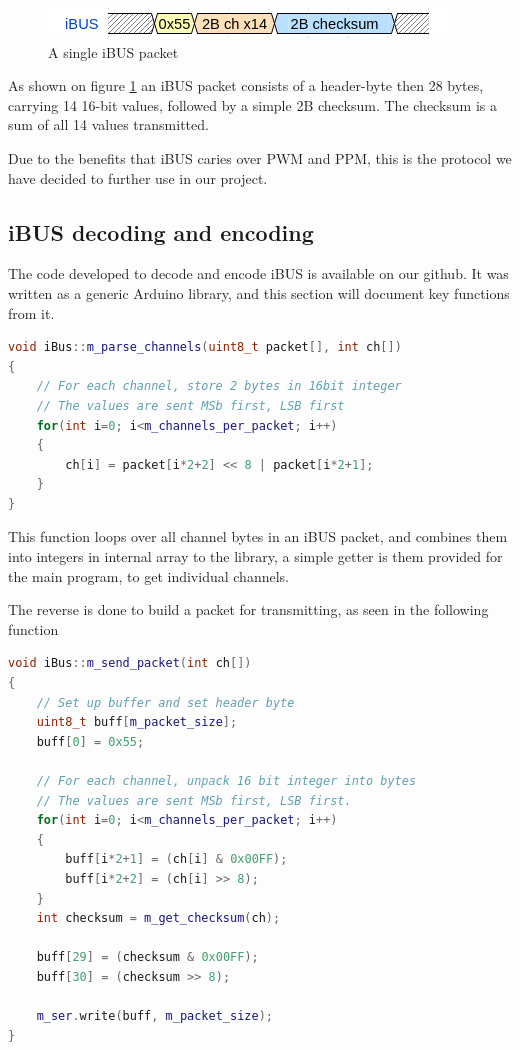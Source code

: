 \begin{figure}[h]
    \centering
    \includegraphics[width=0.8\columnwidth]{figures/ch_design/iBUS.png}
    \caption{A single iBUS packet}
    \label{fig:iBUS}
\end{figure}

As shown on figure \ref{fig:iBUS} an iBUS packet consists of a header-byte then 28 bytes, carrying 14 16-bit values, followed by a simple 2B checksum. The checksum is a sum of all 14 values transmitted.

Due to the benefits that iBUS caries over PWM and PPM, this is the protocol we have decided to further use in our project.

\subsection{iBUS decoding and encoding}

The code developed to decode and encode iBUS is available on our github\cite{ibus-lib}.
It was written as a generic Arduino library, and this section will document key functions from it.

\begin{lstlisting}[language=C++, caption={Parser for iBUS packets}]
void iBus::m_parse_channels(uint8_t packet[], int ch[])
{
	// For each channel, store 2 bytes in 16bit integer
	// The values are sent MSb first, LSB first
	for(int i=0; i<m_channels_per_packet; i++)
	{
		ch[i] = packet[i*2+2] << 8 | packet[i*2+1];
	}
}
\end{lstlisting}

This function loops over all channel bytes in an iBUS packet, and combines them into integers in internal array to the library, a simple getter is them provided for the main program, to get individual channels.

The reverse is done to build a packet for transmitting, as seen in the following function

\begin{lstlisting}[language=C++, caption={Function for constructing and transmitting for iBUS packets}]
void iBus::m_send_packet(int ch[])
{
	// Set up buffer and set header byte
	uint8_t buff[m_packet_size];
	buff[0] = 0x55;

	// For each channel, unpack 16 bit integer into bytes
	// The values are sent MSb first, LSB first.
	for(int i=0; i<m_channels_per_packet; i++)
	{
		buff[i*2+1] = (ch[i] & 0x00FF);
		buff[i*2+2] = (ch[i] >> 8);
	}
	int checksum = m_get_checksum(ch);

	buff[29] = (checksum & 0x00FF);
	buff[30] = (checksum >> 8);

	m_ser.write(buff, m_packet_size);
}
\end{lstlisting}

